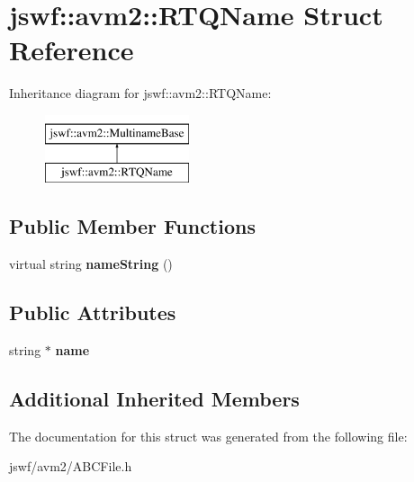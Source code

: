 \hypertarget{structjswf_1_1avm2_1_1_r_t_q_name}{\section{jswf\+:\+:avm2\+:\+:R\+T\+Q\+Name Struct Reference}
\label{structjswf_1_1avm2_1_1_r_t_q_name}
}
Inheritance diagram for jswf\+:\+:avm2\+:\+:R\+T\+Q\+Name\+:\begin{figure}[H]
\begin{center}
\leavevmode
\includegraphics[height=2.000000cm]{structjswf_1_1avm2_1_1_r_t_q_name}
\end{center}
\end{figure}
\subsection*{Public Member Functions}
\begin{DoxyCompactItemize}
\item 
\hypertarget{structjswf_1_1avm2_1_1_r_t_q_name_ab40d7f9d6df3feb9937e48fa88d18881}{virtual string {\bfseries name\+String} ()}\label{structjswf_1_1avm2_1_1_r_t_q_name_ab40d7f9d6df3feb9937e48fa88d18881}

\end{DoxyCompactItemize}
\subsection*{Public Attributes}
\begin{DoxyCompactItemize}
\item 
\hypertarget{structjswf_1_1avm2_1_1_r_t_q_name_a1917dda4ed3249ce064634c3d7b098e9}{string $\ast$ {\bfseries name}}\label{structjswf_1_1avm2_1_1_r_t_q_name_a1917dda4ed3249ce064634c3d7b098e9}

\end{DoxyCompactItemize}
\subsection*{Additional Inherited Members}


The documentation for this struct was generated from the following file\+:\begin{DoxyCompactItemize}
\item 
jswf/avm2/A\+B\+C\+File.\+h\end{DoxyCompactItemize}

